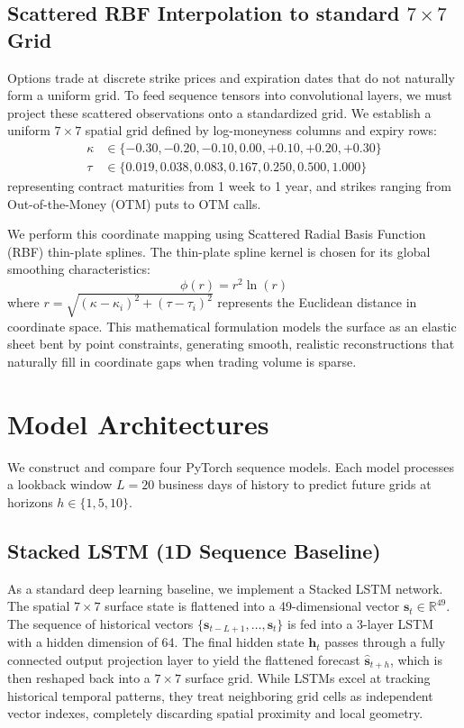 \documentclass[conference]{IEEEtran}
\begin{document}
\subsection{Scattered RBF Interpolation to standard $7 \times 7$ Grid}

Options trade at discrete strike prices and expiration dates that do not naturally form a uniform grid. To feed sequence tensors into convolutional layers, we must project these scattered observations onto a standardized grid. We establish a uniform $7 \times 7$ spatial grid defined by log-moneyness columns and expiry rows:
\begin{align}
\kappa &\in \{-0.30, -0.20, -0.10, 0.00, +0.10, +0.20, +0.30\} \\
\tau &\in \{0.019, 0.038, 0.083, 0.167, 0.250, 0.500, 1.000\}
\end{align}
representing contract maturities from 1 week to 1 year, and strikes ranging from Out-of-the-Money (OTM) puts to OTM calls. 

We perform this coordinate mapping using Scattered Radial Basis Function (RBF) thin-plate splines. The thin-plate spline kernel is chosen for its global smoothing characteristics:
\begin{equation}
\phi(r) = r^2 \ln(r)
\end{equation}
where $r = \sqrt{(\kappa - \kappa_i)^2 + (\tau - \tau_i)^2}$ represents the Euclidean distance in coordinate space. This mathematical formulation models the surface as an elastic sheet bent by point constraints, generating smooth, realistic reconstructions that naturally fill in coordinate gaps when trading volume is sparse. 

\section{Model Architectures}

We construct and compare four PyTorch sequence models. Each model processes a lookback window $L=20$ business days of history to predict future grids at horizons $h \in \{1, 5, 10\}$.

\subsection{Stacked LSTM (1D Sequence Baseline)}

As a standard deep learning baseline, we implement a Stacked LSTM network. The spatial $7 \times 7$ surface state is flattened into a 49-dimensional vector $\mathbf{s}_t \in \mathbb{R}^{49}$. The sequence of historical vectors $\{\mathbf{s}_{t-L+1}, \dots, \mathbf{s}_t\}$ is fed into a 3-layer LSTM with a hidden dimension of 64. The final hidden state $\mathbf{h}_t$ passes through a fully connected output projection layer to yield the flattened forecast $\mathbf{\hat{s}}_{t+h}$, which is then reshaped back into a $7 \times 7$ surface grid. While LSTMs excel at tracking historical temporal patterns, they treat neighboring grid cells as independent vector indexes, completely discarding spatial proximity and local geometry.
\end{document}
